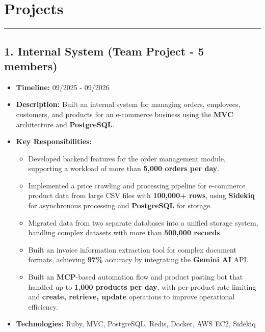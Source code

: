 \documentclass[a4paper,10pt]{article}
\begin{document}
\section{Projects}
\vspace{-10pt}
\noindent\rule{\linewidth}{0.5pt}

\subsection*{1. Internal System \hfill \small (Team Project - 5 members)}
\begin{itemize}
    \item \textbf{Timeline:} 09/2025 - 09/2026
    \item \textbf{Description:} Built an internal system for managing orders, employees, customers, and products for an e-commerce business using the \textbf{MVC} architecture and \textbf{PostgreSQL}.
    \item \textbf{Key Responsibilities:}
    \begin{itemize}
        \item Developed backend features for the order management module, supporting a workload of more than \textbf{5,000 orders per day}.
        \item Implemented a price crawling and processing pipeline for e-commerce product data from large CSV files with \textbf{100,000+ rows}, using \textbf{Sidekiq} for asynchronous processing and \textbf{PostgreSQL} for storage.
        \item Migrated data from two separate databases into a unified storage system, handling complex datasets with more than \textbf{500,000 records}.
        \item Built an invoice information extraction tool for complex document formats, achieving \textbf{97\%} accuracy by integrating the \textbf{Gemini AI} API.
        \item Built an \textbf{MCP}-based automation flow and product posting bot that handled up to \textbf{1,000 products per day}, with per-product rate limiting and \textbf{create, retrieve, update} operations to improve operational efficiency.
    \end{itemize}
    \item \textbf{Technologies:} Ruby, MVC, PostgreSQL, Redis, Docker, AWS EC2, Sidekiq
\end{itemize}
\end{document}
